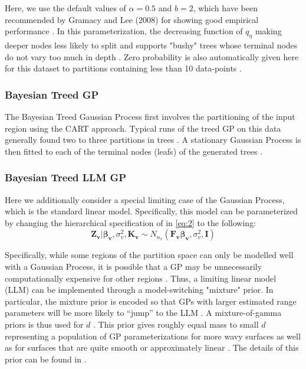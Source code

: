\documentclass{article}\usepackage[]{graphicx}\usepackage[]{color}
\begin{document}
Here, we use the default values of $\alpha = 0.5$ and $b = 2$, which have been recommended by Gramacy and Lee (2008) for showing good empirical performance \cite{gramacy_lee_2008}. In this parameterization, the decreasing function of $q_{\eta}$ making deeper nodes less likely to split and supports "bushy" trees whose terminal nodes do not vary too much in depth \cite{gramacy_lee_2008}. Zero probability is also automatically given here for this dataset to partitions containing less than 10 data-points \cite{gramacy_2007}. 

\subsubsection*{Bayesian Treed GP}

The Bayesian Treed Gaussian Process first involves the partitioning of the input region using the CART approach. Typical runs of the treed GP on this data generally found two to three partitions in trees \cite{gramacy_lee_2008}. A stationary Gaussian Process is then fitted to each of the terminal nodes (leafs) of the generated trees \cite{gramacy_lee_2008}.

\subsubsection*{Bayesian Treed LLM GP}

Here we additionally consider a special limiting case of the Gaussian Process, which is the standard linear model. Specifically, this model can be parameterized by changing the hierarchical specification of   in \ref{eq:2} to the following:
\begin{equation}
\boldsymbol{Z_v}|\boldsymbol{\beta_v}, \sigma_v^2, \boldsymbol{K_v} \sim N_{n_v}(\boldsymbol{F_v}\boldsymbol{\beta_v}, \sigma_v^2, \boldsymbol{I})
\end{equation}

Specifically, while some regions of the partition space can only be modelled well with a Gaussian Process, it is possible that a GP may be unnecessarily computationally expensive for other regions \cite{gramacy_lee_2008}. Thus, a limiting linear model (LLM) can be implemented through a model-switching "mixture" prior. In particular, the mixture prior is encoded so that  GPs with larger estimated range parameters will be more likely to “jump” to the LLM \cite{gramacy_2007}. A mixture-of-gamma priors is thus used for $d$ \cite{gramacy_2007}. This prior gives roughly equal mass to small $d$ representing a population of GP parameterizations for more wavy surfaces as well as for surfaces that are quite smooth or approximately linear \cite{gramacy_2007}. The details of this prior can be found in \cite{gramacy_2007}.
\end{document}
